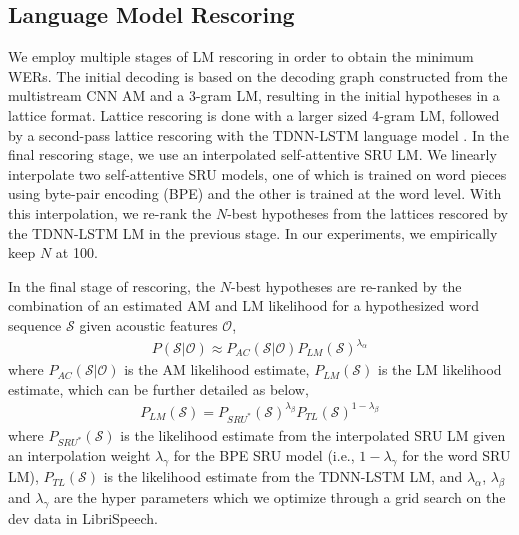 \documentclass[a4paper]{article}
\begin{document}
\subsection{Language Model Rescoring}
We employ multiple stages of LM rescoring in order to obtain the minimum WERs. The initial decoding is based on the decoding graph constructed from the multistream CNN AM and a 3-gram LM, resulting in the initial hypotheses in a lattice format. Lattice rescoring is done with a larger sized 4-gram LM, followed by a second-pass lattice rescoring with the TDNN-LSTM language model \cite{Li2018}. In the final rescoring stage, we use an interpolated self-attentive SRU LM. We linearly interpolate two self-attentive SRU models, one of which is trained on word pieces using byte-pair encoding (BPE) and the other is trained at the word level. With this interpolation, we re-rank the $N$-best hypotheses from the lattices rescored by the TDNN-LSTM LM in the previous stage. In our experiments, we empirically keep $N$ at 100. 

In the final stage of rescoring, the $N$-best hypotheses are re-ranked by the combination of an estimated AM and LM likelihood for a hypothesized word sequence $\mathcal{S}$ given acoustic features $\mathcal{O}$,
\begin{align}
    P(\mathcal{S}|\mathcal{O}) \approx P_{AC}(\mathcal{S}|\mathcal{O})P_{LM}(\mathcal{S})^{\lambda_{\alpha}}
\end{align}
where $P_{AC}(\mathcal{S}|\mathcal{O})$ is the AM likelihood estimate, $P_{LM}(\mathcal{S})$ is the LM likelihood estimate, which can be further detailed as below,
\begin{align}
    P_{LM}(\mathcal{S}) = P_{SRU^*}(\mathcal{S})^{\lambda_{\beta}}P_{TL}(\mathcal{S})^{1-\lambda_{\beta}}
\end{align}
where $P_{SRU^*}(\mathcal{S})$ is the likelihood estimate from the interpolated SRU LM given an interpolation weight $\lambda_{\gamma}$ for the BPE SRU model (i.e., $1-\lambda_{\gamma}$ for the word SRU LM), $P_{TL}(\mathcal{S})$ is the likelihood estimate from the TDNN-LSTM LM, and $\lambda_{\alpha}$, $\lambda_{\beta}$ and $\lambda_{\gamma}$ are the hyper parameters which we optimize through a grid search on the dev data in LibriSpeech.
\end{document}
